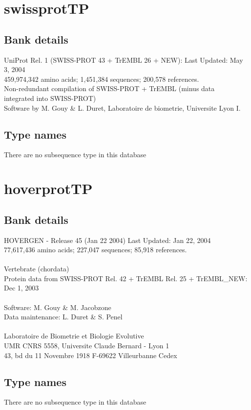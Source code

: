 \documentclass{article}
\begin{document}
\begin{Schunk}
\section{ swissprotTP }
\subsection{Bank details}
UniProt Rel. 1 (SWISS-PROT 43 + TrEMBL 26 + NEW): Last Updated: May  3, 2004\\
459,974,342 amino acids; 1,451,384 sequences; 200,578 references.\\
Non-redundant compilation of SWISS-PROT + TrEMBL (minus  data\\
integrated  into  SWISS-PROT)\\
Software by M. Gouy \& L. Duret, Laboratoire de biometrie, Universite Lyon I.

\subsection{Type names}
There are no subsequence type in this database
\section{ hoverprotTP }
\subsection{Bank details}
HOVERGEN - Release 45 (Jan 22 2004) Last Updated: Jan 22, 2004\\
77,617,436 amino acids; 227,047 sequences; 85,918 references.\\
\\
Vertebrate (chordata)\\
Protein data from SWISS-PROT Rel. 42  + TrEMBL Rel. 25 + TrEMBL\_NEW: Dec 1, 2003\\
\\
Software: M. Gouy \& M. Jacobzone\\
Data maintenance: L. Duret \& S. Penel\\
\\
Laboratoire de Biometrie et Biologie Evolutive\\
UMR CNRS 5558, Universite Claude Bernard - Lyon 1\\
43, bd du 11 Novembre 1918 F-69622 Villeurbanne Cedex\\


\subsection{Type names}
There are no subsequence type in this database

\end{Schunk}
\end{document}
